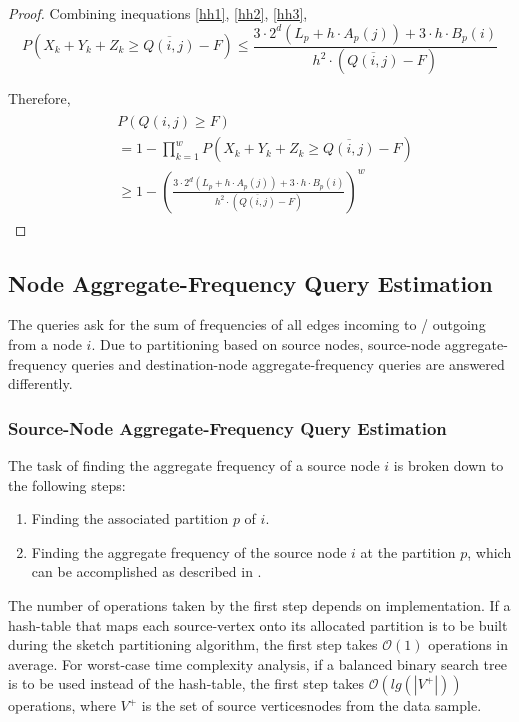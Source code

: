 \begin{proof}
Combining inequations \ref{hh1}, \ref{hh2}, \ref{hh3},
\begin{equation}
  P(X_k + Y_k + Z_k \geq \overline{Q(i,j)}-F) \leq \frac{3\cdot2^d(L_p+h\cdot A_p(j)) + 3\cdot h\cdot B_p(i)}{h^2\cdot (\overline{Q(i,j)}-F)}
\end{equation}

Therefore,
\begin{align}
\begin{split}
&  P(Q(i,j) \geq F)
\\  &= 1 - \prod _{k=1}^{w}P(X_k + Y_k + Z_k \geq \overline{Q(i,j)}-F)
\\  &\geq 1-(\frac{3\cdot2^d(L_p+h\cdot A_p(j)) + 3\cdot h\cdot B_p(i)}{h^2\cdot (\overline{Q(i,j)}-F)})^w
\end{split}
\end{align}

\end{proof}

\subsection{Node Aggregate-Frequency Query Estimation}

The queries ask for the sum of frequencies of all edges incoming to / outgoing from a node $i$. Due to partitioning based on source nodes, source-node aggregate-frequency queries and destination-node aggregate-frequency queries are answered differently.

\subsubsection{Source-Node Aggregate-Frequency Query Estimation}

The task of finding the aggregate frequency of a source node $i$ is broken down to the following steps:

\begin{enumerate}
\item Finding the associated partition $p$ of $i$.
\item Finding the aggregate frequency of the source node $i$ at the partition $p$, which can be accomplished as described in \cite{khan}.
\end{enumerate}

The number of operations taken by the first step depends on implementation. If a hash-table that maps each source-vertex onto its allocated partition is to be built during the sketch partitioning algorithm, the first step takes $\mathcal{O}(1)$ operations in average. For worst-case time complexity analysis, if a balanced binary search tree is to be used instead of the hash-table, the first step takes $\mathcal{O}(lg(|V^{+}|))$ operations, where $V^{+}$ is the set of source verticesnodes from the data sample.

